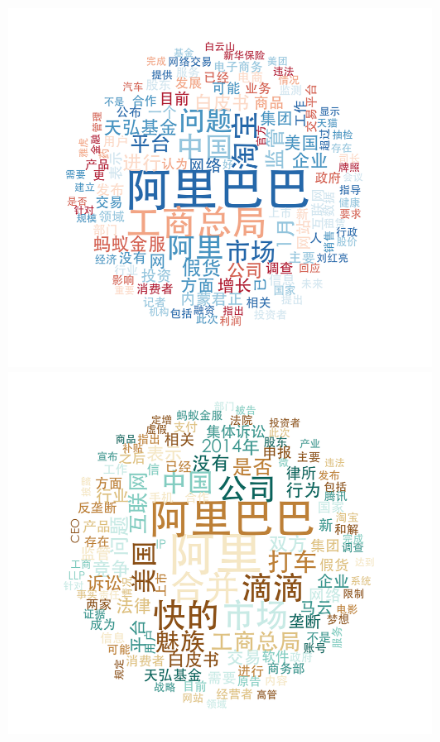 \documentclass{beamer}
\begin{document}
\begin{frame}
\begin{figure}
    \includegraphics[height=0.3\textheight]{plot/Jan-wordcloud.png}    \includegraphics[height=0.3\textheight]{plot/Feb-wordcloud.png}

\end{figure}
\end{frame}
\end{document}
